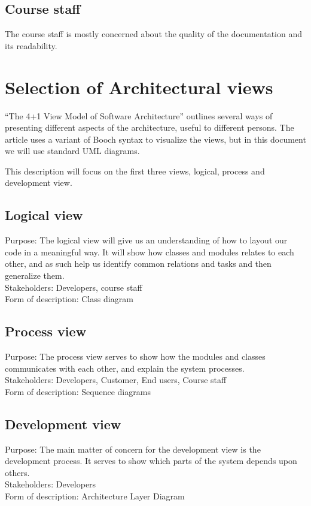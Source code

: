 \documentclass[11pt]{book}
\begin{document}
\subsection{Course staff}
The course staff is mostly concerned about the quality of the documentation and its readability.

\section{Selection of Architectural views}
``The 4+1 View Model of Software Architecture'' \cite{Kruchten:1995:VMA:624610.625529} outlines several ways of presenting different aspects of the architecture, useful to different persons. The article uses a variant of Booch syntax to visualize the views, but in this document we will use standard UML diagrams.

This description will focus on the first three views, logical, process and development view.

\subsection{Logical view}
Purpose: The logical view will give us an understanding of how to layout our code in a meaningful way. It will show how classes and modules relates to each other, and as such help us identify common relations and tasks and then generalize them.\\
Stakeholders: Developers, course staff\\
Form of description: Class diagram

\subsection{Process view}
Purpose: The process view serves to show how the modules and classes communicates with each other, and explain the system processes.\\
Stakeholders: Developers, Customer, End users, Course staff\\
Form of description: Sequence diagrams

\subsection{Development view}
Purpose: The main matter of concern for the development view is the development process. It serves to show which parts of the system depends upon others. \\
Stakeholders: Developers\\
Form of description: Architecture Layer Diagram
\end{document}
